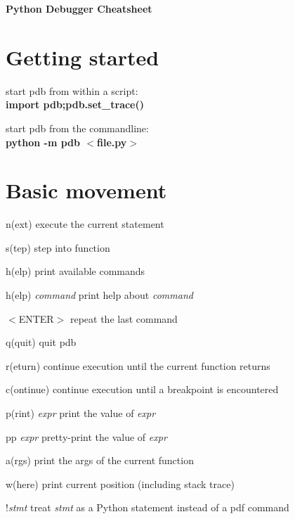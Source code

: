 \documentclass[11pt,landscape,a4paper]{scrartcl}
\newcommand{\keystroke}[1]{$<$#1$>$}
\begin{document}
  \begin{center}
    \huge \bfseries Python Debugger Cheatsheet\\
    \vspace{1cm}
  \end{center}

  \begin{multicols}{2}
    \section{Getting started}
      start pdb from within a script:\\
      {\bfseries import pdb;pdb.set\_trace()}
      
      start pdb from the commandline:\\
      {\bfseries python -m pdb \keystroke{file.py}}
      
    \section{Basic movement}
      \begin{eqlist}
        \item[n(ext)] execute the current statement
        \item[s(tep)] step into function
        \item[h(elp)] print available commands
        \item[h(elp) \textit{command}] print help about \textit{command}
        \item[\keystroke{ENTER}] repeat the last command
        \item[q(quit)] quit pdb

        \item[r(eturn)] continue execution until the current function returns
        \item[c(ontinue)] continue execution until a breakpoint is encountered

        \item[p(rint) \textit{expr}] print the value of \textit{expr}
        \item[pp \textit{expr}] pretty-print the value of \textit{expr}
        \item[a(rgs)] print the args of the current function
        \item[w(here)] print current position (including stack trace)
        
        \item[!\textit{stmt}] treat \textit{stmt} as a Python statement instead of a pdf command


\end{eqlist}
\end{multicols}
\end{document}
